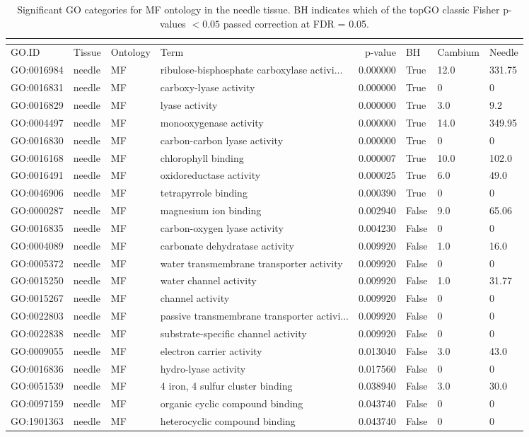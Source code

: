 \begin{longtable}{llllrl}
\caption{Significant GO categories for MF ontology in the needle tissue. BH indicates which of the topGO classic Fisher p-values $< 0.05$ passed correction at FDR = 0.05.}\\
\label{tab:go-needle-MF}\\
\toprule
GO.ID & Tissue & Ontology & Term & p-value & BH & Cambium & Needle \\
\midrule
GO:0016984 & needle & MF &   ribulose-bisphosphate carboxylase activi...  & 0.000000 &   True  & 12.0 & 331.75 \\ 
GO:0016831 & needle & MF &   carboxy-lyase activity  & 0.000000 &   True  & 0 & 0 \\
GO:0016829 & needle & MF &   lyase activity  & 0.000000 &   True  & 3.0 & 9.2 \\ 
GO:0004497 & needle & MF &   monooxygenase activity  & 0.000000 &   True  & 14.0 & 349.95 \\ 
GO:0016830 & needle & MF &   carbon-carbon lyase activity  & 0.000000 &   True  & 0 & 0 \\
GO:0016168 & needle & MF &   chlorophyll binding  & 0.000007 &   True  & 10.0 & 102.0 \\ 
GO:0016491 & needle & MF &   oxidoreductase activity  & 0.000025 &   True  & 6.0 & 49.0 \\ 
GO:0046906 & needle & MF &   tetrapyrrole binding  & 0.000390 &   True  & 0 & 0 \\
GO:0000287 & needle & MF &   magnesium ion binding  & 0.002940 &   False  & 9.0 & 65.06 \\ 
GO:0016835 & needle & MF &   carbon-oxygen lyase activity  & 0.004230 &   False  & 0 & 0 \\
GO:0004089 & needle & MF &   carbonate dehydratase activity  & 0.009920 &   False  & 1.0 & 16.0 \\ 
GO:0005372 & needle & MF &   water transmembrane transporter activity  & 0.009920 &   False  & 0 & 0 \\
GO:0015250 & needle & MF &   water channel activity  & 0.009920 &   False  & 1.0 & 31.77 \\ 
GO:0015267 & needle & MF &   channel activity  & 0.009920 &   False  & 0 & 0 \\
GO:0022803 & needle & MF &   passive transmembrane transporter activi...  & 0.009920 &   False  & 0 & 0 \\
GO:0022838 & needle & MF &   substrate-specific channel activity  & 0.009920 &   False  & 0 & 0 \\
GO:0009055 & needle & MF &   electron carrier activity  & 0.013040 &   False  & 3.0 & 43.0 \\ 
GO:0016836 & needle & MF &   hydro-lyase activity  & 0.017560 &   False  & 0 & 0 \\
GO:0051539 & needle & MF &   4 iron, 4 sulfur cluster binding  & 0.038940 &   False  & 3.0 & 30.0 \\ 
GO:0097159 & needle & MF &   organic cyclic compound binding  & 0.043740 &   False  & 0 & 0 \\
GO:1901363 & needle & MF &   heterocyclic compound binding  & 0.043740 &   False  & 0 & 0 \\
\bottomrule
\end{longtable}
